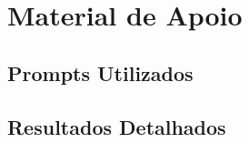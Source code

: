﻿\chapter{Material de Apoio}
\label{ap:material-apoio}

\section{Prompts Utilizados}
\label{ap:prompts}

\section{Resultados Detalhados}
\label{ap:resultados}
